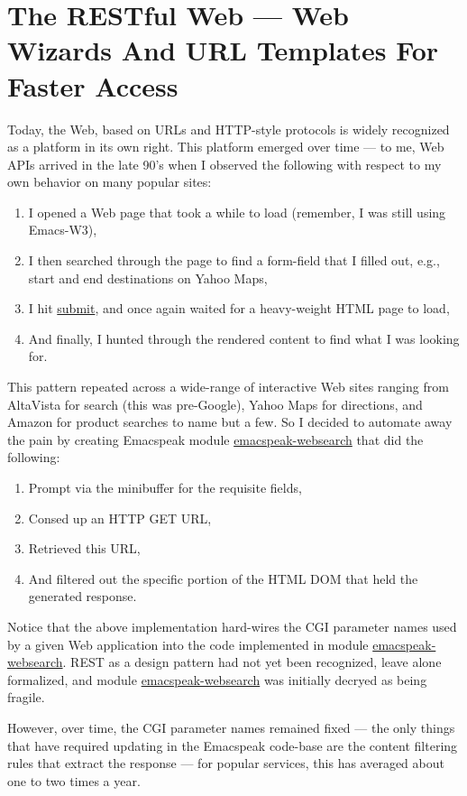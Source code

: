 \documentclass[11pt]{article}
\begin{document}
\section{The RESTful Web —  Web Wizards And URL Templates For Faster Access}
\label{sec-14}

Today, the Web, based on URLs and HTTP-style protocols is widely
recognized as a platform in its own right. This platform emerged
over time — to me, Web APIs arrived in the late 90's when I
observed the following with respect to my own behavior on many
popular sites:

\begin{enumerate}
\item I opened a Web page that took a while to load (remember,  I
was still using Emacs-W3),
\item I then searched through the page to find a form-field that
I filled out, e.g., start and end destinations on Yahoo Maps,
\item I hit \uline{submit}, and once again waited for a heavy-weight
HTML page to load,
\item And finally, I hunted through the rendered content to find
what I was looking for.
\end{enumerate}

This pattern repeated across a wide-range of interactive Web
sites ranging from AltaVista for search (this was pre-Google),
Yahoo Maps for directions, and Amazon for product searches to
name but a few. So I decided to automate away the pain by
creating Emacspeak module \uline{emacspeak-websearch} that did the
following:

\begin{enumerate}
\item Prompt via the minibuffer for the requisite fields,
\item Consed up an HTTP GET URL,
\item Retrieved this URL,
\item And filtered out the specific portion of the HTML  DOM that
held the generated response.
\end{enumerate}

Notice that the above implementation hard-wires the CGI parameter
names used by a given Web application into the code implemented
in module \uline{emacspeak-websearch}. REST as a design pattern had not
yet been recognized, leave alone formalized, and module
\uline{emacspeak-websearch} was initially decryed as being fragile.

However, over time, the CGI parameter names remained fixed — the
 only things that have required updating in the Emacspeak
 code-base are the content filtering rules that extract the
 response — for popular services, this has averaged about one to
 two times a year.
\end{document}
